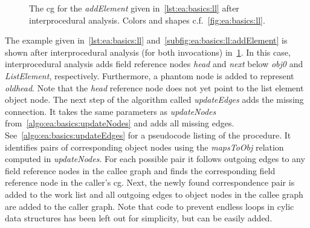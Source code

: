 			\begin{figure}
				\centering%
				\caption[The  for \emph{addElement} after interprocedural analysis]{%
					The \acrlong{cg} for the \emph{addElement} given in~\cref{lst:ea:basics:ll} after interprocedural analysis.
					Colors and shapes c.f.~\cref{fig:ea:basics:ll}.}%
				\label{fig:ea:basics:ll:inter}%
			\end{figure}

			The example given in~\cref{lst:ea:basics:ll} and~\cref{subfig:ea:basics:ll:addElement} is shown after
			interprocedural analysis (for both invocations) in~\cref{fig:ea:basics:ll:inter}. In this case, interprocedural
			analysis adds field reference nodes \emph{head} and \emph{next} below \emph{obj0} and \emph{ListElement},
			respectively. Furthermore, a phantom node is added to represent \emph{oldhead}. Note that the \emph{head}
			reference node does not yet point to the list element object node. The next step of the algorithm called
			\emph{updateEdges} adds the missing connection. It takes the same parameters as \emph{updateNodes}
			from~\cref{algo:ea:basics:updateNodes} and adds all missing edges. See~\cref{algo:ea:basics:updateEdges} for
			a pseudocode listing of the procedure. It identifies pairs of corresponding object nodes using the
			\emph{mapsToObj} relation computed in \emph{updateNodes}. For each possible pair it follows outgoing edges to any
			field reference nodes in the callee graph and finds the corresponding field reference node in the caller's
			\gls{cg}. Next, the newly found correspondence pair is added to the work list and all outgoing edges to object
			nodes in the callee graph are added to the caller graph. Note that code to prevent endless loops in cylic data
			structures has been left out for simplicity, but can be easily added.

